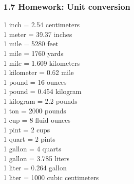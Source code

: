 

\fancyhead[LE]{\thepage}



\subsubsection*{1.7 Homework: Unit conversion}
\begin{multicols}{3}
  1 inch = 2.54 centimeters\\
  1 meter = 39.37 inches\\
  1 mile = 5280 feet\\
  1 mile = 1760 yards\\
  1 mile = 1.609 kilometers\\
  1 kilometer = 0.62 mile\\
  1 pound = 16 ounces\\
  1 pound = 0.454 kilogram \\
  1 kilogram = 2.2 pounds \\
  1 ton = 2000 pounds\\
  1 cup = 8 fluid ounces \\
  1 pint = 2 cups\\
  1 quart = 2 pints\\
  1 gallon = 4 quarts\\
  1 gallon = 3.785 liters\\
  1 liter = 0.264 gallon\\
  1 liter = 1000 cubic centimeters
\end{multicols}

